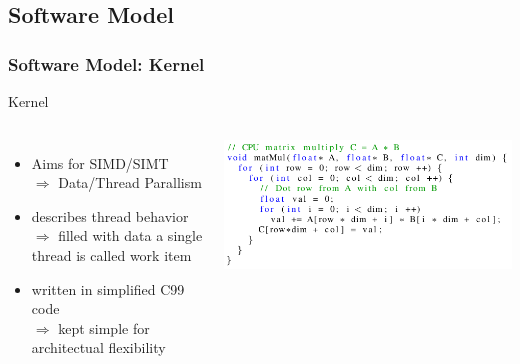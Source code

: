 \documentclass{beamer}
\begin{document}
\subsection{Software Model}
\begin{frame}
    \frametitle{Software Model: Kernel}
        Kernel
        \begin{columns}
            \begin{itemize}
            \item Aims for SIMD/SIMT\\
            $\Rightarrow$ Data/Thread Parallism
            \item describes thread behavior\\
            $\Rightarrow$ filled with data a single thread is called work item
            \item written in simplified C99 code\\
            $\Rightarrow$ kept simple for architectual flexibility
            \end{itemize} 
            \includegraphics[width=\textwidth]{res/CodeExample.png}   
    \end{columns}
\end{frame}
\end{document}
